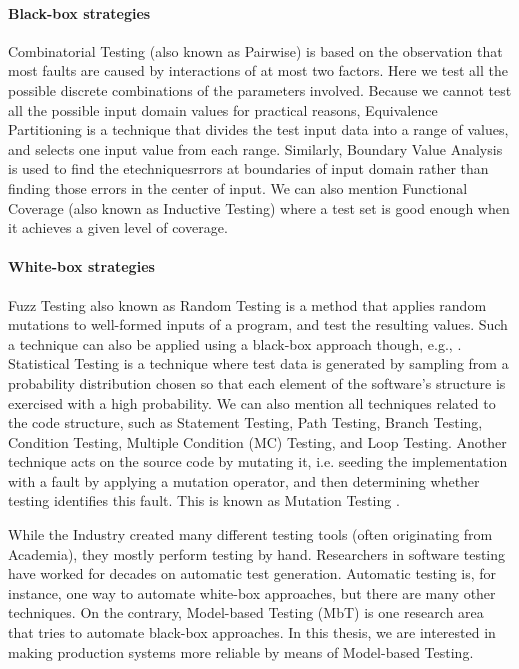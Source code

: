 \paragraph{Black-box strategies} Combinatorial Testing (also
known as Pairwise) \cite{Tai98atest} is based on the observation
that most faults are caused by interactions of at most two
factors. Here we test all the possible discrete combinations of
the parameters involved.  Because we cannot test all the possible
input domain values for practical reasons, Equivalence
Partitioning \cite{Huang13} is a technique that divides the test
input data into a range of values, and selects one input value
from each range. Similarly, Boundary Value Analysis
\cite{Ramachandran:2003:TSC:942796.943301} is used to find the
etechniquesrrors at boundaries of input domain rather than finding those
errors in the center of input. We can also mention Functional
Coverage (also known as Inductive Testing)
\cite{Walkinshaw:2010:IFC:1928028.1928038} where a test set is
good enough when it achieves a given level of coverage.

\paragraph{White-box strategies} Fuzz Testing also known as
Random Testing
\cite{Duran:1981:RRT:800078.802530,Godefroid08automatedwhitebox}
is a method that applies random mutations to well-formed inputs
of a program, and test the resulting values. Such a technique can
also be applied using a black-box approach though, e.g.,
\cite{5387827}.  Statistical Testing
\cite{Walton:1995:STS:210453.210458} is a technique where test
data is generated by sampling from a probability distribution
chosen so that each element of the software's structure is
exercised with a high probability. We can also mention all
techniques related to the code structure, such as Statement
Testing, Path Testing, Branch Testing, Condition Testing,
Multiple Condition (MC) Testing, and Loop Testing.  Another
technique acts on the source code by mutating it, i.e.  seeding
the implementation with a fault by applying a mutation operator,
and then determining whether testing identifies this fault. This
is known as Mutation Testing \cite{1702444}.

While the Industry created many different testing tools (often
originating from Academia), they mostly perform testing by hand.
Researchers in software testing have worked for decades on
automatic test generation. Automatic testing is, for instance,
one way to automate white-box approaches, but there are many
other techniques. On the contrary, Model-based Testing (MbT) is
one research area that tries to automate black-box approaches.
In this thesis, we are interested in making production systems
more reliable by means of Model-based Testing.

